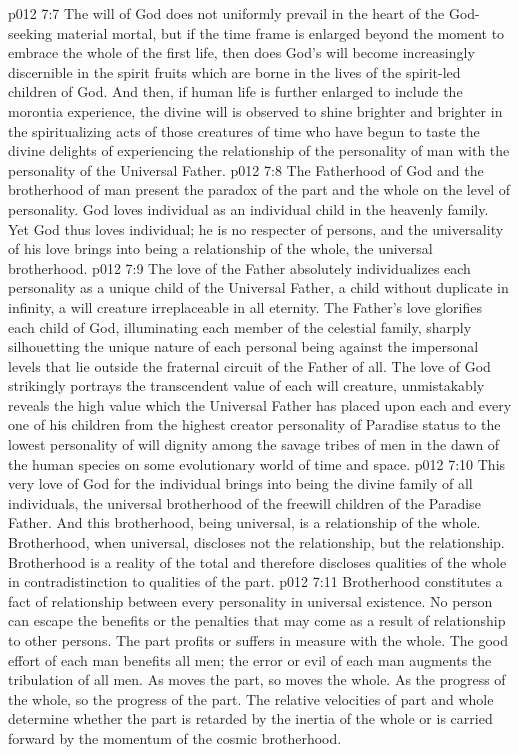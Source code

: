 \vs p012 7:7 \pc The will of God does not uniformly prevail in the heart of the God\hyp{}seeking material mortal, but if the time frame is enlarged beyond the moment to embrace the whole of the first life, then does God’s will become increasingly discernible in the spirit fruits which are borne in the lives of the spirit\hyp{}led children of God. And then, if human life is further enlarged to include the morontia experience, the divine will is observed to shine brighter and brighter in the spiritualizing acts of those creatures of time who have begun to taste the divine delights of experiencing the relationship of the personality of man with the personality of the Universal Father.
\vs p012 7:8 The Fatherhood of God and the brotherhood of man present the paradox of the part and the whole on the level of personality. God loves  individual as an individual child in the heavenly family. Yet God thus loves  individual; he is no respecter of persons, and the universality of his love brings into being a relationship of the whole, the universal brotherhood.
\vs p012 7:9 The love of the Father absolutely individualizes each personality as a unique child of the Universal Father, a child without duplicate in infinity, a will creature irreplaceable in all eternity. The Father’s love glorifies each child of God, illuminating each member of the celestial family, sharply silhouetting the unique nature of each personal being against the impersonal levels that lie outside the fraternal circuit of the Father of all. The love of God strikingly portrays the transcendent value of each will creature, unmistakably reveals the high value which the Universal Father has placed upon each and every one of his children from the highest creator personality of Paradise status to the lowest personality of will dignity among the savage tribes of men in the dawn of the human species on some evolutionary world of time and space.
\vs p012 7:10 This very love of God for the individual brings into being the divine family of all individuals, the universal brotherhood of the freewill children of the Paradise Father. And this brotherhood, being universal, is a relationship of the whole. Brotherhood, when universal, discloses not the  relationship, but the  relationship. Brotherhood is a reality of the total and therefore discloses qualities of the whole in contradistinction to qualities of the part.
\vs p012 7:11 Brotherhood constitutes a fact of relationship between every personality in universal existence. No person can escape the benefits or the penalties that may come as a result of relationship to other persons. The part profits or suffers in measure with the whole. The good effort of each man benefits all men; the error or evil of each man augments the tribulation of all men. As moves the part, so moves the whole. As the progress of the whole, so the progress of the part. The relative velocities of part and whole determine whether the part is retarded by the inertia of the whole or is carried forward by the momentum of the cosmic brotherhood.
